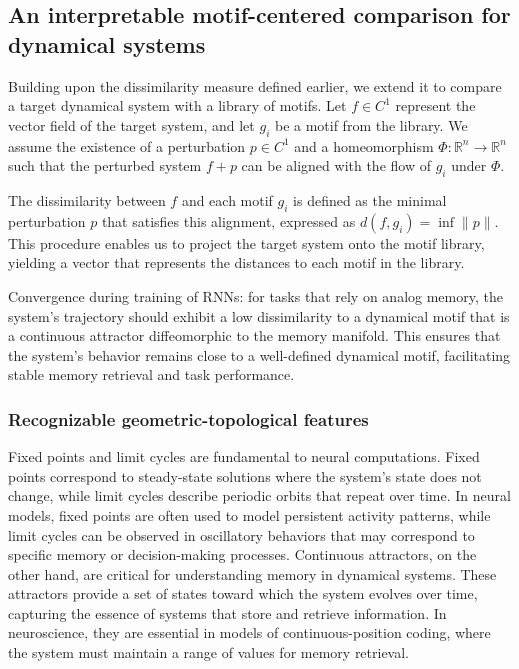 \documentclass{article}
\theoremstyle{definition} \newtheorem{definition}{Definition}  \newtheorem{example}{Example}
\theoremstyle{remark} \newtheorem{remark}{Remark}
\newcounter{ct}
\begin{document}
\subsection{An interpretable motif-centered comparison for dynamical systems}\label{sec:aut_motif_metric}
Building upon the dissimilarity measure defined earlier, we extend it to compare a target dynamical system with a library of motifs. Let \( f \in C^1 \) represent the vector field of the target system, and let \( g_i \) be a motif from the library. We assume the existence of a perturbation \( p \in C^1 \) and a homeomorphism \( \Phi: \mathbb{R}^n \rightarrow \mathbb{R}^n \) such that the perturbed system \( f + p \) can be aligned with the flow of \( g_i \) under \( \Phi \). 

The dissimilarity between \( f \) and each motif \( g_i \) is defined as the minimal perturbation \( p \) that satisfies this alignment, expressed as \( d(f, g_i) = \inf \|p\| \).
 This procedure enables us to project the target system onto the motif library, yielding a vector that represents the distances to each motif in the library.

Convergence during training of RNNs: for tasks that rely on analog memory, the system's trajectory should exhibit a low dissimilarity to a dynamical motif that is a continuous attractor diffeomorphic to the memory manifold.
 This ensures that the system's behavior remains close to a well-defined dynamical motif, facilitating stable memory retrieval and task performance.


\subsubsection{Recognizable geometric-topological features}
 Fixed points and limit cycles are fundamental to neural computations.
Fixed points correspond to steady-state solutions where the system’s state does not change, while limit cycles describe periodic orbits that repeat over time.
 In neural models, fixed points are often used to model persistent activity patterns, while limit cycles can be observed in oscillatory behaviors that may correspond to specific memory or decision-making processes.
  Continuous attractors, on the other hand, are critical for understanding memory in dynamical systems.
These attractors provide a set of states toward which the system evolves over time, capturing the essence of systems that store and retrieve information.
 In neuroscience, they are essential in models of continuous-position coding, where the system must maintain a range of values for memory retrieval.
\end{document}
